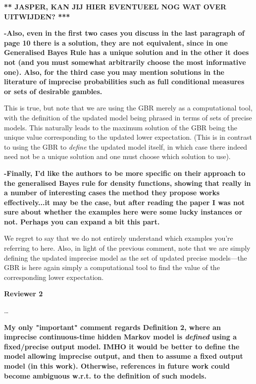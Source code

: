 \documentclass[twoside,11pt]{letter}
\begin{document}
{\bf *** JASPER, KAN JIJ HIER EVENTUEEL NOG WAT OVER UITWIJDEN? *** }

{\bf
-Also, even in the first two cases you discuss in the last paragraph of page 10 there is a solution, they are not equivalent, since in one Generalised Bayes Rule has a unique solution and in the other it does not (and you must somewhat arbitrarily choose the most informative one). Also, for the third case you may mention solutions in the literature of imprecise probabilities such as full conditional measures or sets of desirable gambles. }

This is true, but note that we are using the GBR merely as a computational tool, with the definition of the updated model being phrased in terms of sets of precise models. This naturally leads to the maximum solution of the GBR being the unique value corresponding to the updated lower expectation. (This is in contrast to using the GBR to \emph{define} the updated model itself, in which case there indeed need not be a unique solution and one must choose which solution to use).

{\bf
-Finally, I'd like the authors to be more specific on their approach to the generalised Bayes rule for density functions, showing that really in a number of interesting cases the method they propose works effectively...it may be the case, but after reading the paper I was not sure about whether the examples here were some lucky instances or not. Perhaps you can expand a bit this part. }

We regret to say that we do not entirely understand which examples you're referring to here. Also, in light of the previous comment, note that we are simply defining the updated imprecise model as the set of updated precise models---the GBR is here again simply a computational tool to find the value of the corresponding lower expectation.

\newpage
{\bf Reviewer 2}

\ldots

{\bf
My only "important" comment regards Definition 2, where an imprecise continuous-time hidden Markov model is \emph{defined} using a fixed/precise output model. IMHO it would be better to define the model allowing imprecise output, and then to assume a fixed output model (in this work). Otherwise, references in future work could become ambiguous w.r.t. to the definition of such models. }
\end{document}
